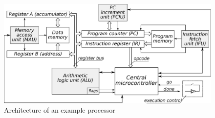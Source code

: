 \begin{figure}
\begin{centering}
\includegraphics[width=1.04\columnwidth]{fig/processor_architecture}
\par\end{centering}
\caption{Architecture of an example processor\label{app-fig-Architecture-of-example}}
\vspace{-6mm}
\end{figure}


